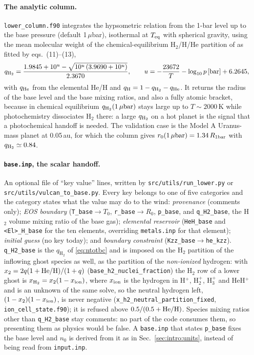 \paragraph{The analytic column.} \texttt{lower\_column.f90} integrates the
hypsometric relation from the 1-bar level up to the base pressure (default
1\,$\mu$bar), isothermal at $T_{\rm eq}$ with spherical gravity, using the
mean molecular weight of the chemical-equilibrium H$_2$/H/He partition of
\citet{Visscher2006} as fitted by \citet{Koskinen2022} eqs.~(11)--(13),
\begin{equation}
q_{\rm H_2} = \frac{1.9845+10^{u}-\sqrt{10^{u}\left(3.9690+10^{u}\right)}}{2.3670},
\qquad
u = -\frac{23672}{T}-\log_{10}p\,[{\rm bar}]+6.2645,
\label{eq:mol:qh2}
\end{equation}
with $q_{\rm He}$ from the elemental He/H and $q_{\rm H} = 1-q_{\rm H_2}-q_{\rm He}$.
It returns the radius of the base level and the base mixing ratios, and
also a fully atomic bracket, because in chemical equilibrium
$q_{\rm H_2}(1\,\mu{\rm bar})$ stays large up to $T\sim2000$\,K while
photochemistry dissociates H$_2$ there: a large $q_{\rm H_2}$ on a hot planet
is the signal that a photochemical handoff is needed. The validation case is
the \citet{Koskinen2022} Model A Uranus-mass planet at 0.05\,au, for which
the column gives $r_0(1\,\mu{\rm bar}) = 1.34\,R_{1\rm bar}$ with
$q_{\rm H_2}\simeq0.84$.

\paragraph{\texttt{base.inp}, the scalar handoff.} An optional file of
``key value'' lines, written by \texttt{src/utils/run\_lower.py} or
\texttt{src/utils/vulcan\_to\_base.py}. Every key belongs to one of five
categories and the category states what the value may do to the wind:
\emph{provenance} (comments only); \emph{EOS boundary}
(\texttt{T\_base}$\to T_0$, \texttt{r\_base}$\to R_0$, \texttt{p\_base}, and
\texttt{q\_H2\_base}, the H$_2$ volume mixing ratio of the base gas);
\emph{elemental reservoir} (\texttt{HeH\_base} and
\texttt{<El>\_H\_base} for the ten elements, overriding \texttt{metals.inp}
for that element); \emph{initial guess} (no key today); and \emph{boundary
constraint} (\texttt{Kzz\_base}$\to$\texttt{he\_kzz}). \texttt{q\_H2\_base}
is the $q_{\mathrm{H_2}}$ of \eqref{eq:ntotbc} and is imposed on the H$_2$
partition of the inflowing ghost species as well, as the partition of the
\emph{non-ionized} hydrogen: with $x_2 = 2q(1+{\rm He/H})/(1+q)$
(\texttt{base\_h2\_nuclei\_fraction}) the H$_2$ row of a lower ghost is
$x_{\rm H_2} = x_2(1-x_{\rm ion})$, where $x_{\rm ion}$ is the hydrogen in
H$^+$, H$_2^+$, H$_3^+$ and HeH$^+$ and is an unknown of the same solve, so
the neutral hydrogen left, $(1-x_2)(1-x_{\rm ion})$, is never negative
(\texttt{x\_h2\_neutral\_partition\_fixed}, \texttt{ion\_cell\_state.f90}); it is refused above
$0.5/(0.5+{\rm He/H})$. Species mixing ratios other than \texttt{q\_H2\_base}
stay comments: no part of the code consumes them, so presenting them as
physics would be false. A \texttt{base.inp} that states \texttt{p\_base} fixes the base level and
$n_0$ is derived from it as in Sec.~\ref{sec:intro:units}, instead of being
read from \texttt{input.inp}.

